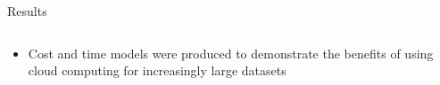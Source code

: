 \documentclass[final,hyperref={pdfpagelabels=false}]{beamer}
\begin{document}
\begin{frame}
\begin{columns}
\begin{column}{.5\textwidth}
{\begin{block}{Results}
\begin{column}{.47\textwidth}
\begin{itemize}
                      \item Cost and time models were produced to demonstrate the benefits of using cloud computing for increasingly large datasets
                  \end{itemize}
                  \end{column}
\end{block}}
\end{column}
\end{columns}
\end{frame}
\end{document}
